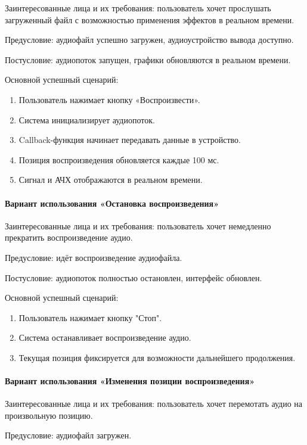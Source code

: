 Заинтересованные лица и их требования: пользователь хочет прослушать загруженный файл с возможностью применения эффектов в реальном времени.

Предусловие: аудиофайл успешно загружен, аудиоустройство вывода доступно.

Постусловие: аудиопоток запущен, графики обновляются в реальном времени.

Основной успешный сценарий:
\begin{enumerate}
	\item Пользователь нажимает кнопку «Воспроизвести».
	\item Система инициализирует аудиопоток.
	\item Callback-функция начинает передавать данные в устройство.
	\item Позиция воспроизведения обновляется каждые 100 мс.
	\item Сигнал и АЧХ отображаются в реальном времени.
\end{enumerate}

\paragraph{Вариант использования «Остановка воспроизведения»}

Заинтересованные лица и их требования: пользователь хочет немедленно прекратить воспроизведение аудио.

Предусловие: идёт воспроизведение аудиофайла.

Постусловие: аудиопоток полностью остановлен, интерфейс обновлен.

Основной успешный сценарий:
\begin{enumerate}
	\item Пользователь нажимает кнопку "Стоп".
	\item Система останавливает воспроизведение аудио.
	\item Текущая позиция фиксируется для возможности дальнейшего продолжения.
\end{enumerate}

\paragraph{Вариант использования «Изменения позиции воспроизведения»}

Заинтересованные лица и их требования: пользователь хочет перемотать аудио на произвольную позицию.

Предусловие: аудиофайл загружен.

